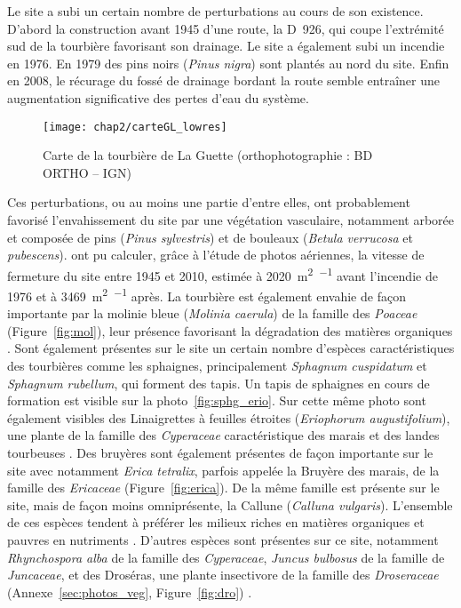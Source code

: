 Le site a subi un certain nombre de perturbations au cours de son existence.
D'abord la construction avant 1945 d'une route, la D~926, qui coupe l'extrémité sud de la tourbière favorisant son drainage.
Le site a également subi un incendie en 1976.
En 1979 des pins noirs (\textit{Pinus nigra}) sont plantés au nord du site.
Enfin en 2008, le récurage du fossé de drainage bordant la route semble entraîner une augmentation significative des pertes d'eau du système.

\begin{figure}
\texttt{[image: chap2/carteGL\_lowres]}
\caption{Carte de la tourbière de La Guette (orthophotographie : BD ORTHO\textsuperscript{\textregistered} -- IGN)}
\label{fig:carte_LG}
\end{figure}

Ces perturbations, ou au moins une partie d'entre elles, ont probablement favorisé l'envahissement du site par une végétation vasculaire, notamment arborée et composée de pins (\textit{Pinus sylvestris}) et de bouleaux (\textit{Betula verrucosa} et \textit{pubescens}).
\citet{viel2015} ont pu calculer, grâce à l'étude de photos aériennes, la vitesse de fermeture du site entre 1945 et 2010, estimée à \SI{2020}{\square\metre\per\year} avant l'incendie de 1976 et à \SI{3469}{\square\metre\per\year} après.
La tourbière est également envahie de façon importante par la molinie bleue (\textit{Molinia caerula}) de la famille des \textit{Poaceae} (Figure~\ref{fig:mol}), leur présence favorisant la dégradation des matières organiques \citep{gogo2011}.
Sont également présentes sur le site un certain nombre d'espèces caractéristiques des tourbières comme les sphaignes, principalement \textit{Sphagnum cuspidatum} et \textit{Sphagnum rubellum}, qui forment des tapis.
Un tapis de sphaignes en cours de formation est visible sur la photo~\ref{fig:sphg_erio}.
Sur cette même photo sont également visibles des Linaigrettes à feuilles étroites (\textit{Eriophorum augustifolium}), une plante de la famille des \textit{Cyperaceae} caractéristique des marais et des landes tourbeuses \citep{rameau2008}.
Des bruyères sont également présentes de façon importante sur le site avec notamment \textit{Erica tetralix}, parfois appelée la Bruyère des marais, de la famille des \textit{Ericaceae} (Figure~\ref{fig:erica}).
De la même famille est présente sur le site, mais de façon moins omniprésente, la Callune (\textit{Calluna vulgaris}).
L'ensemble de ces espèces tendent à préférer les milieux riches en matières organiques et pauvres en nutriments \citep{rameau2008}.
D'autres espèces sont présentes sur ce site, notamment \textit{Rhynchospora alba} de la famille des \textit{Cyperaceae}, \textit{Juncus bulbosus} de la famille de \textit{Juncaceae}, et des Droséras, une plante insectivore de la famille des \textit{Droseraceae} (Annexe~\ref{sec:photos_veg}, Figure~\ref{fig:dro}) . 

